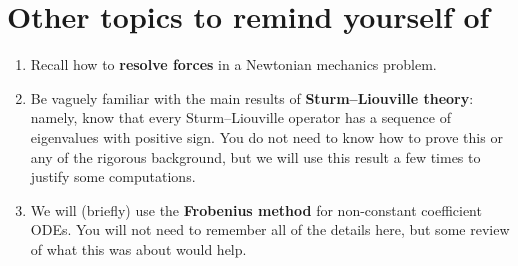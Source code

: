 \documentclass[a4paper,12pt]{article}
\begin{document}
\section{Other topics to remind yourself of}
\begin{enumerate}[label=(\alph*)]
    \item Recall how to \textbf{resolve forces} in a Newtonian mechanics problem.
    \item Be vaguely familiar with the main results of \textbf{Sturm--Liouville theory}: namely, know that every Sturm--Liouville operator has a sequence of eigenvalues with positive sign. You do not need to know how to prove this or any of the rigorous background, but we will use this result a few times to justify some computations.
    \item We will (briefly) use the \textbf{Frobenius method} for non-constant coefficient ODEs. You will not need to remember all of the details here, but some review of what this was about would help.
    
\end{enumerate}
\end{document}
